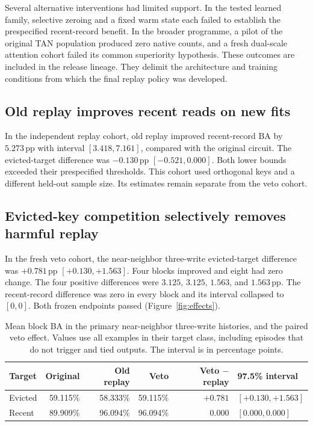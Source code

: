 \documentclass[10pt]{article}
\newcommand{\pp}{\,\mathrm{pp}}
\begin{document}
Several alternative interventions had limited support. In the tested learned family, selective zeroing and a fixed warm state each failed to establish the prespecified recent-record benefit. In the broader programme, a pilot of the original TAN population produced zero native counts, and a fresh dual-scale attention cohort failed its common superiority hypothesis. These outcomes are included in the release lineage. They delimit the architecture and training conditions from which the final replay policy was developed.

\subsection{Old replay improves recent reads on new fits}
In the independent replay cohort, old replay improved recent-record BA by $5.273\pp$ with interval $[3.418,7.161]$, compared with the original circuit. The evicted-target difference was $-0.130\pp$ $[-0.521,0.000]$. Both lower bounds exceeded their prespecified thresholds. This cohort used orthogonal keys and a different held-out sample size. Its estimates remain separate from the veto cohort.

\subsection{Evicted-key competition selectively removes harmful replay}
In the fresh veto cohort, the near-neighbor three-write evicted-target difference was $+0.781\pp$ $[+0.130,+1.563]$. Four blocks improved and eight had zero change. The four positive differences were $3.125$, $3.125$, $1.563$, and $1.563\pp$. The recent-record difference was zero in every block and its interval collapsed to $[0,0]$. Both frozen endpoints passed (Figure~\ref{fig:effects}).

\begin{table}[htbp]
\centering
\caption{Mean block BA in the primary near-neighbor three-write histories, and the paired veto effect. Values use all examples in their target class, including episodes that do not trigger and tied outputs. The interval is in percentage points.}
\label{tab:veto}
\small
\begin{tabular}{@{}lrrrrl@{}}
\toprule
Target & Original & Old replay & Veto & Veto $-$ replay & 97.5\% interval \\
\midrule
Evicted & 59.115\% & 58.333\% & 59.115\% & $+0.781$ & $[+0.130,+1.563]$ \\
Recent & 89.909\% & 96.094\% & 96.094\% & $0.000$ & $[0.000,0.000]$ \\
\bottomrule
\end{tabular}
\end{table}
\end{document}
